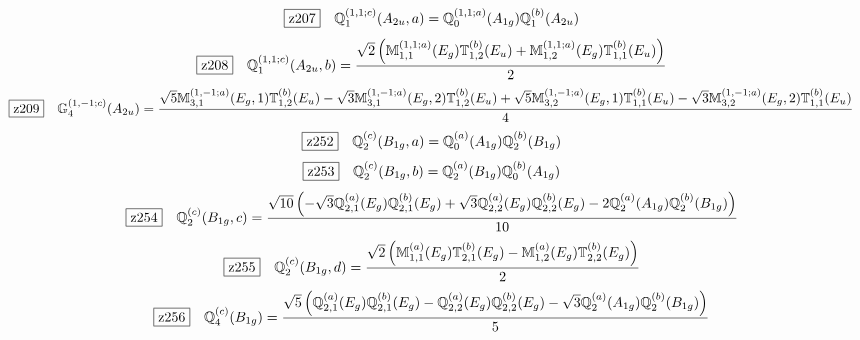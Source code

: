 \documentclass[fleqn,10pt,landscape]{jsarticle}
\begin{document}
\begin{dmath*}
\hspace*{3mm}\fbox{z207}\quad \mathbb{Q}_{1}^{(1,1;c)}(A_{2u},a)=\mathbb{Q}_{0}^{(1,1;a)}(A_{1g}) \mathbb{Q}_{1}^{(b)}(A_{2u})
\end{dmath*}
\begin{dmath*}
\hspace*{3mm}\fbox{z208}\quad \mathbb{Q}_{1}^{(1,1;c)}(A_{2u},b)=\frac{\sqrt{2} \left(\mathbb{M}_{1,1}^{(1,1;a)}(E_{g}) \mathbb{T}_{1,2}^{(b)}(E_{u}) + \mathbb{M}_{1,2}^{(1,1;a)}(E_{g}) \mathbb{T}_{1,1}^{(b)}(E_{u})\right)}{2}
\end{dmath*}
\begin{dmath*}
\hspace*{3mm}\fbox{z209}\quad \mathbb{G}_{4}^{(1,-1;c)}(A_{2u})=\frac{\sqrt{5} \mathbb{M}_{3,1}^{(1,-1;a)}(E_{g},1) \mathbb{T}_{1,2}^{(b)}(E_{u}) - \sqrt{3} \mathbb{M}_{3,1}^{(1,-1;a)}(E_{g},2) \mathbb{T}_{1,2}^{(b)}(E_{u}) + \sqrt{5} \mathbb{M}_{3,2}^{(1,-1;a)}(E_{g},1) \mathbb{T}_{1,1}^{(b)}(E_{u}) - \sqrt{3} \mathbb{M}_{3,2}^{(1,-1;a)}(E_{g},2) \mathbb{T}_{1,1}^{(b)}(E_{u})}{4}
\end{dmath*}
\begin{dmath*}
\hspace*{3mm}\fbox{z252}\quad \mathbb{Q}_{2}^{(c)}(B_{1g},a)=\mathbb{Q}_{0}^{(a)}(A_{1g}) \mathbb{Q}_{2}^{(b)}(B_{1g})
\end{dmath*}
\begin{dmath*}
\hspace*{3mm}\fbox{z253}\quad \mathbb{Q}_{2}^{(c)}(B_{1g},b)=\mathbb{Q}_{2}^{(a)}(B_{1g}) \mathbb{Q}_{0}^{(b)}(A_{1g})
\end{dmath*}
\begin{dmath*}
\hspace*{3mm}\fbox{z254}\quad \mathbb{Q}_{2}^{(c)}(B_{1g},c)=\frac{\sqrt{10} \left(- \sqrt{3} \mathbb{Q}_{2,1}^{(a)}(E_{g}) \mathbb{Q}_{2,1}^{(b)}(E_{g}) + \sqrt{3} \mathbb{Q}_{2,2}^{(a)}(E_{g}) \mathbb{Q}_{2,2}^{(b)}(E_{g}) - 2 \mathbb{Q}_{2}^{(a)}(A_{1g}) \mathbb{Q}_{2}^{(b)}(B_{1g})\right)}{10}
\end{dmath*}
\begin{dmath*}
\hspace*{3mm}\fbox{z255}\quad \mathbb{Q}_{2}^{(c)}(B_{1g},d)=\frac{\sqrt{2} \left(\mathbb{M}_{1,1}^{(a)}(E_{g}) \mathbb{T}_{2,1}^{(b)}(E_{g}) - \mathbb{M}_{1,2}^{(a)}(E_{g}) \mathbb{T}_{2,2}^{(b)}(E_{g})\right)}{2}
\end{dmath*}
\begin{dmath*}
\hspace*{3mm}\fbox{z256}\quad \mathbb{Q}_{4}^{(c)}(B_{1g})=\frac{\sqrt{5} \left(\mathbb{Q}_{2,1}^{(a)}(E_{g}) \mathbb{Q}_{2,1}^{(b)}(E_{g}) - \mathbb{Q}_{2,2}^{(a)}(E_{g}) \mathbb{Q}_{2,2}^{(b)}(E_{g}) - \sqrt{3} \mathbb{Q}_{2}^{(a)}(A_{1g}) \mathbb{Q}_{2}^{(b)}(B_{1g})\right)}{5}
\end{dmath*}
\end{document}
